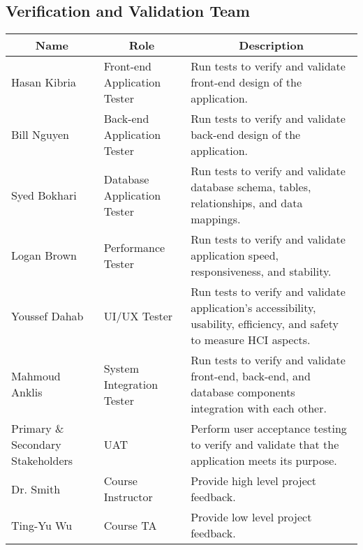 \documentclass[12pt, titlepage]{article}
\begin{document}

\subsection{Verification and Validation Team}


\begin{table}[H]
	\centering
	\begin{tabular}{|p{3cm}|p{4cm}|p{7cm}|}
		\hline
		\multicolumn{1}{|c|}{\textbf{Name}} & \multicolumn{1}{|c|}{\textbf{Role}} & \multicolumn{1}{|c|}{\textbf{Description}}
		\\ \hline
		Hasan Kibria & Front-end Application Tester & Run tests to verify and validate front-end design of the application.
		\\ \hline
		Bill Nguyen & Back-end Application Tester & Run tests to verify and validate back-end design of the application.
		\\ \hline
		Syed Bokhari & Database Application Tester & Run tests to verify and validate database schema, tables, relationships, and data mappings. 
		\\ \hline
		Logan Brown & Performance Tester & Run tests to verify and validate application speed, responsiveness, and stability.
		\\ \hline
		Youssef Dahab & UI/UX Tester & Run tests to verify and validate application's accessibility, usability, efficiency, and safety to measure HCI aspects.
		\\ \hline  
		Mahmoud Anklis & System Integration Tester & Run tests to verify and validate front-end, back-end, and database components integration with each other.
		\\ \hline
		Primary \& Secondary Stakeholders & UAT & Perform user acceptance testing to verify and validate that the application meets its purpose.
		\\ \hline
		Dr. Smith & Course Instructor & Provide high level project feedback.
		\\ \hline
		Ting-Yu Wu & Course TA & Provide low level project feedback.
		\\ \hline
	\end{tabular}
\end{table}
\end{document}
